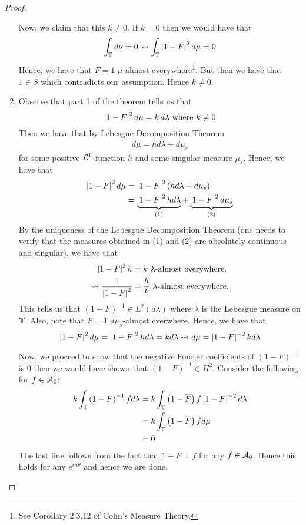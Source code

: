 \begin{proof}
\begin{enumerate}
    Now, we claim that this $k\ne 0$. If $k=0$ then we would have that 
    \begin{equation*}
	\int_{\mathbb T} d\nu = 0 \leadsto \int_{\mathbb T} \left\lvert 1-F \right\rvert^{2} d\mu = 0
    \end{equation*}
    Hence, we have that $F=1$ $\mu$-almost everywhere\footnote{See Corollary 2.3.12 of Cohn's Measure Theory.}. But then we have that $1\in S$ which contradicts our assumption. Hence $k \ne 0$.
\item Observe that part 1 of the theorem tells us that 
    \begin{equation*}
	\left\lvert 1-F \right\rvert^{2} d\mu = k\, d\lambda \text{ where } k \ne 0
    \end{equation*}
    Then we have that by Lebesgue Decomposition Theorem
    \begin{align*}
	d\mu = h d\lambda + d\mu_{s}
    \end{align*}
    for some positive ${\cal L}^{1}$-function $h$ and some singular measure $\mu_{s}$.
    Hence, we have that
    \begin{align}
	\left\lvert 1-F \right\rvert^{2} d\mu &= \left\lvert 1-F \right\rvert^{2} \left( h d\lambda + d\mu_{s} \right) \\
	&= \underbrace{\left\lvert 1-F \right\rvert^{2} h d\lambda}_{(1)} + \underbrace{\left\lvert 1-F \right\rvert^{2} d\mu_{s}}_{(2)}
	\label{eqn:decomposed-measure}
    \end{align}
    By the uniqueness of the Lebesgue Decomposition Theorem (one needs to verify that the measures obtained in (1) and (2) are absolutely continuous and singular), we have that
\begin{align*}
    \left\lvert 1-F \right\rvert^{2} h &= k \text{ $\lambda$-almost everywhere.} \\
    \leadsto \frac{1}{\left\lvert 1-F \right\rvert^{2}} &= \frac{h}{k} \text{ $\lambda$-almost everywhere.}
\end{align*}
This tells us that $(1-F)^{-1} \in L^{2} \left( d\lambda \right)$ where $\lambda$ is the Lebesgue measure on $\mathbb T$. Also, note that $F=1$ $d\mu_{s}$-almost everwhere. Hence, we have that 
\begin{equation}
    \left\lvert 1-F \right\rvert^{2} d\mu = \left\lvert 1-F \right\rvert^{2} h d\lambda = k d\lambda \leadsto d\mu = \left\lvert 1-F \right\rvert^{-2} k d\lambda
    \label{eqn:prelude-to-f-m}
    \end{equation}

    Now, we proceed to show that the negative Fourier coefficients of $\left( 1-F \right)^{-1}$ is 0 then we would have shown that $\left( 1-F \right)^{-1} \in H^{2}$. Consider the following for $f\in {\cal A}_{0}$:
\begin{align*}
    k \int_{\mathbb T} \left( 1-F \right)^{-1} f d\lambda &= k \int_{\mathbb T} \left( 1-\overline F \right) f \left\lvert 1-F \right\rvert^{-2} d\lambda \\
    &= k \int_{\mathbb T} \left( 1-\overline F \right) f d\mu \\
    &= 0
\end{align*}
The last line follows from the fact that $1-F \perp f$ for any $f\in {\cal A}_{0}$. Hence this holds for any $e^{in\theta}$ and hence we are done.


\end{enumerate}
\end{proof}
